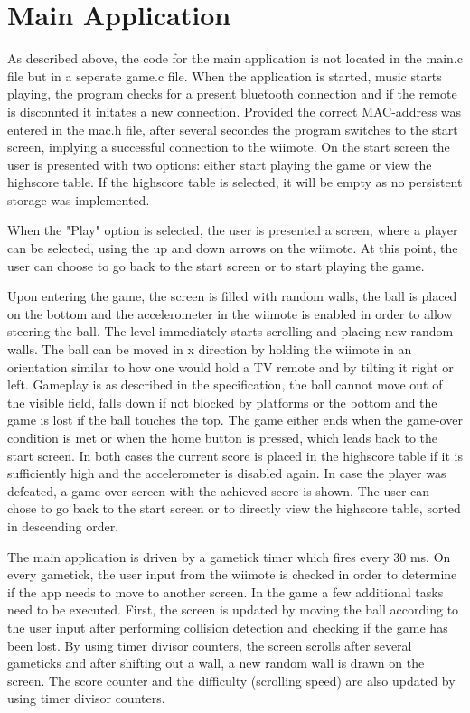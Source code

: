 \documentclass[12pt,a4paper,titlepage,oneside]{article}
\begin{document}
\section{Main Application}

As described above, the code for the main application is not located in the
main.c file but in a seperate game.c file. When the application is started,
music starts playing,
the program checks for a present bluetooth connection and if the remote is
disconnted it initates a new connection. Provided the correct MAC-address
was entered in the mac.h file, after several secondes the program switches
to the start screen, implying a successful connection to the wiimote. On the
start screen the user is presented with two options: either start playing the
game or view the highscore table. If the highscore table is selected, it will
be empty as no persistent storage was implemented.

When the "Play" option is
selected, the user is presented a screen, where a player can be selected, using
the up and down arrows on the wiimote. At this point, the user can choose to
go back to the start screen or to start playing the game.

Upon entering the
game, the screen is filled with random walls, the ball is placed on the bottom
and the accelerometer in the wiimote is enabled in order to allow steering the
ball. The level immediately starts scrolling and placing new random walls. The
ball can be moved in x direction by holding the wiimote in an orientation similar
to how one would hold a TV remote and by tilting it right or left. Gameplay is
as described in the specification, the ball cannot move out of the visible 
field, falls down if not blocked by platforms or the bottom and the game is lost
if the ball touches the top. The game either ends when the game-over condition is
met or when the home button is pressed, which leads back to the start screen.
In both cases the current score is placed in the highscore table if it is 
sufficiently high and the accelerometer is disabled again. In case the player 
was defeated, a game-over screen with the achieved score is shown. The user
can chose to go back to the start screen or to directly view the highscore
table, sorted in descending order.

The main application is driven by a gametick timer which fires every 30 ms.
On every gametick, the user input from the wiimote is checked in order to
determine if the app needs to move to another screen. In the game a few
additional tasks need to be executed. First, the screen is updated by moving
the ball according to the user input after performing collision detection and
checking if the game has been lost. By using timer divisor counters, the screen
scrolls after several gameticks and after shifting out a wall, a new random
wall is drawn on the screen. The score counter and the difficulty (scrolling
speed) are also updated by using timer divisor counters.
\end{document}
